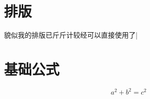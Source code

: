 \documentclass[UTF8]{ctexart}
\begin{document}
    \section{排版}
    貌似我的排版已斤斤计较经可以直接使用了|
    \section{基础公式}
    \[
        a^2 + b^2 = c^2
    \]
\end{document}
